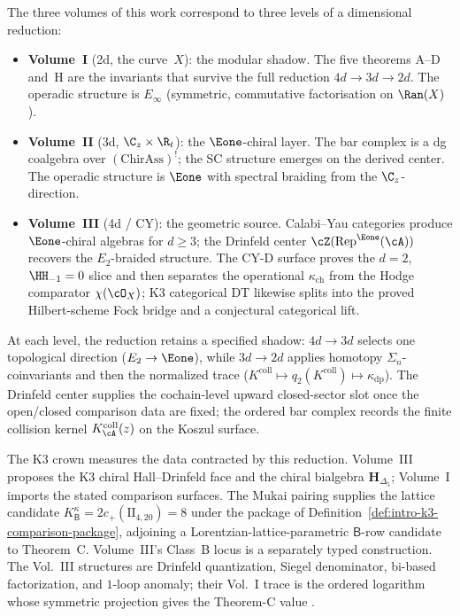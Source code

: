 \begin{remark}
\label{rem:three-volume-dimensional-reduction}
The three volumes of this work correspond to three levels of a
dimensional reduction:
\begin{itemize}
\item \textbf{Volume~I} (2d, the curve~$X$): the modular shadow.
 The five theorems A--D and~H are the invariants that survive the
 full reduction $4d \to 3d \to 2d$. The operadic structure is
 $E_\infty$ (symmetric, commutative factorisation on $\Ran(X)$).
\item \textbf{Volume~II} (3d, $\C_z \times \R_t$): the
 $\Eone$-chiral layer. The bar complex is a dg coalgebra over
 $(\mathrm{ChirAss})^!$; the SC structure emerges on the derived center.
 The operadic structure is $\Eone$ with spectral braiding from the
 $\C_z$-direction.
\item \textbf{Volume~III} (4d / CY): the geometric source.
 Calabi--Yau categories produce $\Eone$-chiral algebras for
 $d \geq 3$; the Drinfeld center
 $\cZ(\mathrm{Rep}^{\Eone}(\cA))$ recovers the $E_2$-braided
 structure. The CY-D surface proves the $d=2$,
 $\HH_{-1}=0$ slice and then separates the operational
 $\kappa_{\mathrm{ch}}$ from the Hodge comparator
 $\chi(\cO_X)$; K3 categorical DT likewise splits into the
 proved Hilbert-scheme Fock bridge and a conjectural categorical
 lift.
\end{itemize}
At each level, the reduction retains a specified shadow:
$4d\to3d$ selects one topological direction ($E_2\to\Eone$), while
$3d\to2d$ applies homotopy $\Sigma_n$-coinvariants and then the
normalized trace
($K^{\mathrm{coll}}\mapsto q_2(K^{\mathrm{coll}})
\mapsto\kappa_{\mathrm{dp}}$). The
Drinfeld center supplies the cochain-level upward closed-sector slot once the
open/closed comparison data are fixed; the ordered bar complex records
the finite collision kernel $K_\cA^{\mathrm{coll}}(z)$ on the Koszul
surface.
\end{remark}

\noindent
The K3 crown measures the data contracted by this reduction. Volume~III
proposes the K3 chiral Hall--Drinfeld face and the chiral bialgebra
$\mathbf{H}_{\Delta_5}$; Volume~I imports the stated comparison
surfaces. The Mukai pairing supplies the lattice candidate
$K^\kappa_{\mathsf B}=2c_+(\mathrm{II}_{4,20})=8$ under the package of
Definition~\ref{def:intro-k3-comparison-package}, adjoining a
Lorentzian-lattice-parametric $\mathsf B$-row candidate to Theorem~C.
Volume~III's Class~B locus is a separately typed construction. The Vol.~III structures are Drinfeld
quantization, Siegel denominator, bi-based factorization, and
$1$-loop anomaly; their Vol.~I trace is the ordered logarithm whose
symmetric projection gives the Theorem-C value \cite{Drinfeld90,EK96}.

